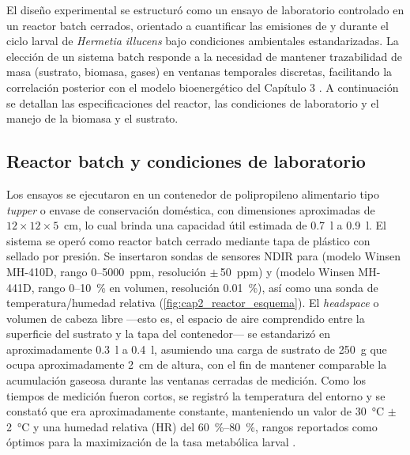 
El diseño experimental se estructuró como un ensayo de laboratorio controlado en un reactor batch cerrados, orientado a cuantificar las emisiones de  y  durante el ciclo larval de \textit{Hermetia illucens} bajo condiciones ambientales estandarizadas. La elección de un sistema batch responde a la necesidad de mantener trazabilidad de masa (sustrato, biomasa, gases) en ventanas temporales discretas, facilitando la correlación posterior con el modelo bioenergético del Capítulo 3 \parencite{eriksenDynamicModellingFeed2022, padmanabhaComprehensiveDynamicGrowth2020}. A continuación se detallan las especificaciones del reactor, las condiciones de laboratorio y el manejo de la biomasa y el sustrato.

\subsection{Reactor batch y condiciones de laboratorio}
\label{subsec:cap2_reactor}

Los ensayos se ejecutaron en un contenedor de polipropileno alimentario tipo \emph{tupper} o envase de conservación doméstica, con dimensiones aproximadas de $12\times12\times5$~cm, lo cual brinda una capacidad útil estimada de \SI{0,7}{\litre} a \SI{0,9}{\litre}. 
El sistema se operó como reactor batch cerrado mediante tapa de plástico con sellado por presión. 
Se insertaron sondas de sensores NDIR para  (modelo Winsen MH-410D, rango 0--\SI{5000}{ppm}, resolución $\pm$\,\SI{50}{ppm}) y  (modelo Winsen MH-441D, rango 0--\SI{10}{\percent} en volumen, resolución \SI{0,01}{\percent}), así como una sonda de temperatura/humedad relativa (\cref{fig:cap2_reactor_esquema}). 
El \emph{headspace} o volumen de cabeza libre ---esto es, el espacio de aire comprendido entre la superficie del sustrato y la tapa del contenedor--- se estandarizó en aproximadamente \SI{0,3}{\litre} a \SI{0,4}{\litre}, asumiendo una carga de sustrato de \SI{250}{\gram} que ocupa aproximadamente \SI{2}{\centi\metre} de altura, con el fin de mantener comparable la acumulación gaseosa durante las ventanas cerradas de medición. 
Como los tiempos de medición fueron cortos, se registró la temperatura del entorno y se constató que era aproximadamente constante, manteniendo un valor de \SI{30}{\celsius} $\pm$\,\SI{2}{\celsius} y una humedad relativa (HR) del \SI{60}{\percent}--\SI{80}{\percent}, rangos reportados como óptimos para la maximización de la tasa metabólica larval \parencite{salamEffectDifferentEnvironmental2022, nayakHermetiaIllucensDiptera2023}.

